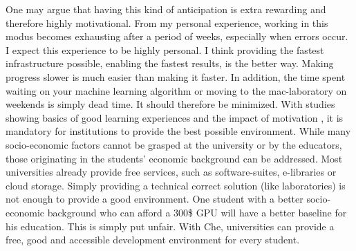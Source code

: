 \documentclass[utf8]{lni}
\begin{document}
One may argue that having this kind of anticipation is extra rewarding and therefore highly motivational.
From my personal experience, working in this modus becomes exhausting after a period of weeks, especially when errors occur. 
I expect this experience to be highly personal. 
I think providing the fastest infrastructure possible, enabling the fastest results, is the better way. 
Making progress slower is much easier than making it faster.  
In addition, the time spent waiting on your machine learning algorithm or moving to the mac-laboratory on weekends is simply dead time. 
It should therefore be minimized.   
With studies showing basics of good learning experiences \cite{FI05}\cite{TC88} and the impact of motivation \cite{HU95}\cite{DECI93}, it is mandatory for institutions to provide the best possible environment. 
While many socio-economic factors cannot be grasped at the university or by the educators, those originating in the students' economic background can be addressed.
Most universities already provide free services, such as software-suites, e-libraries or cloud storage.
Simply providing a technical correct solution (like laboratories) is not enough to provide a good environment.
One student with a better socio-economic background who can afford a 300\$ GPU will have a better baseline for his education. 
This is simply put unfair.
With Che, universities can provide a free, good and accessible development environment for every student.
\end{document}
